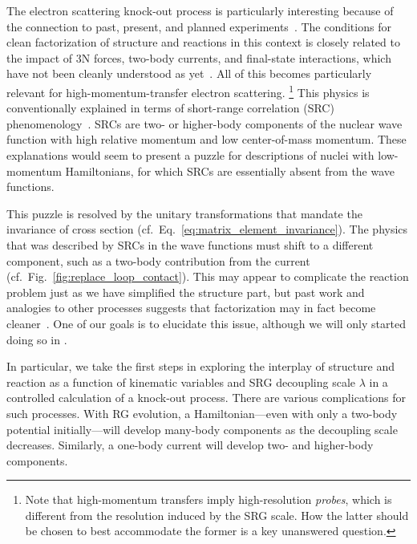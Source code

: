 	The electron scattering knock-out process is particularly interesting because
	of the connection to past, present, and planned
	experiments~\cite{Boffi:1996, LENP_white_paper2015}.
	The conditions for clean factorization
	of structure and reactions in this context is closely related to the impact of
	3N forces,
	two-body currents, and final-state interactions, which have not been cleanly
	understood as yet~\cite{Furnstahl:2010wd}.
	All of this becomes particularly relevant for high-momentum-transfer electron
	scattering.%
	\footnote{Note that high-momentum transfers imply high-resolution
	\emph{probes}, which is different from the resolution induced by the SRG
	scale.  How the latter should be chosen to best
	accommodate the former is a key unanswered question.}
	This physics is conventionally explained in terms of short-range correlation
	(SRC) phenomenology~\cite{Frankfurt:2008zv,Atti:2015eda}.  SRCs are two- or
	higher-body components of the nuclear wave function with high relative
	momentum and low center-of-mass momentum.  These explanations would seem to
	present a	puzzle for descriptions of nuclei with low-momentum Hamiltonians,
	for which	SRCs are essentially absent from the wave functions.

	This puzzle is resolved by the unitary transformations that mandate the
	invariance of cross section (cf.~Eq.~\eqref{eq:matrix_element_invariance}).
	The physics that was described by SRCs in the
	wave functions must shift to a different component, such as a two-body
	contribution from the current (cf.~Fig.~\ref{fig:replace_loop_contact}).
	This may appear to complicate the reaction
	problem just as we have simplified the structure part, but past work and
	analogies to other processes suggests that factorization may in fact
	become cleaner~\cite{Anderson:2010aq,Bogner:2012zm}.  One of our goals is to
	elucidate this issue, although we will only started doing so in
	\cite{More:2015tpa}.

	In particular, we take the first steps in exploring the interplay of
	structure and reaction as a function of kinematic variables and SRG decoupling
	scale $\lambda$ in a controlled calculation of a knock-out process.  There are
	various complications for such processes.  With RG evolution, a
	Hamiltonian---even with only a two-body potential initially---will develop
	many-body components as the decoupling scale decreases.  Similarly, a one-body
	current will develop two- and higher-body components.

